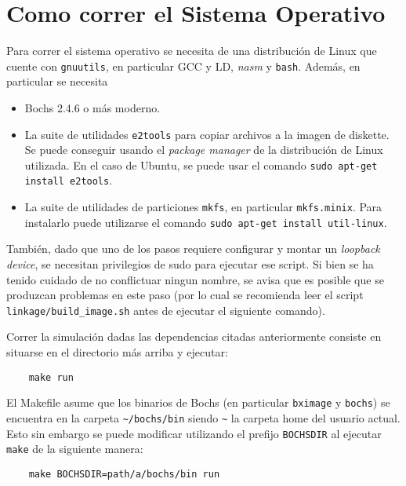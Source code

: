 \appendix
\section{Como correr el Sistema Operativo}

Para correr el sistema operativo se necesita de una distribuci\'on de Linux
que cuente con \texttt{gnuutils}, en particular GCC y LD, \textit{nasm} y \texttt{bash}. 
Adem\'as, en particular se necesita 

\begin{itemize}
	\item Bochs 2.4.6 o m\'as moderno.
	\item La suite de utilidades \texttt{e2tools} para copiar archivos a la
	imagen de diskette. Se puede conseguir usando el \textit{package manager}
	de la distribuci\'on de Linux utilizada. En el caso de Ubuntu, se puede
	usar el comando \texttt{sudo apt-get install e2tools}.
	\item La suite de utilidades de particiones \texttt{mkfs}, en particular
	\texttt{mkfs.minix}. Para instalarlo puede utilizarse el comando
	\texttt{sudo apt-get install util-linux}.
\end{itemize}

Tambi\'en, dado que uno de los pasos requiere configurar y montar un \textit{loopback
device}, se necesitan privilegios de sudo para ejecutar ese script. Si bien se ha
tenido cuidado de no conflictuar ningun nombre, se avisa que es posible que se produzcan
problemas en este paso (por lo cual se recomienda leer el script \texttt{linkage/build\_image.sh} 
antes de ejecutar el siguiente comando).

Correr la simulaci\'on dadas las dependencias citadas anteriormente consiste en situarse en el directorio
m\'as arriba y ejecutar:

\begin{verbatim}
	make run
\end{verbatim}

El Makefile asume que los binarios de Bochs (en particular \texttt{bximage} y \texttt{bochs}) 
se encuentra en la carpeta \texttt{\textasciitilde /bochs/bin}
siendo \texttt{\textasciitilde} la carpeta home del usuario actual. Esto sin embargo se puede modificar
utilizando el prefijo \texttt{BOCHSDIR} al ejecutar \texttt{make} de la siguiente manera:

\begin{verbatim}
	make BOCHSDIR=path/a/bochs/bin run
\end{verbatim}
